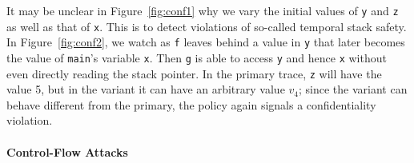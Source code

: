 \documentclass[acmsmall,review,anonymous]{acmart}\settopmatter{printfolios=true,printccs=false,printacmref=false}
\begin{document}
It may be unclear in Figure~\ref{fig:conf1} why we vary the initial values of {\tt y}
and {\tt z} as well as that of {\tt x}. This is to detect violations of so-called
temporal stack safety.
In Figure~\ref{fig:conf2}, we watch as {\tt f} leaves behind a value in {\tt y}
that later becomes the value of {\tt main}'s variable {\tt x}. Then {\tt g} is able to access
{\tt y} and hence {\tt x} without even directly reading the stack pointer.
In the primary trace, {\tt z} will have the value 5, but in the variant it can have
an arbitrary value $v_4$; since the variant can behave different from the primary,
the policy again signals a confidentiality violation.

\paragraph*{Control-Flow Attacks}
\end{document}
